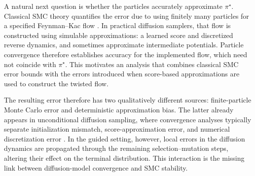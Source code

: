 \documentclass[11pt]{article}
\theoremstyle{plain}
\theoremstyle{definition}
\theoremstyle{remark}
\begin{document}
A natural next question is whether the particles accurately approximate \(\pi^\star\). Classical SMC theory quantifies the error due to using finitely many particles for a specified Feynman--Kac flow \citep{delmoral2004feynman,whiteley2012sequential,douc2014longterm}. In practical diffusion samplers, that flow is constructed using simulable approximations: a learned score and discretized reverse dynamics, and sometimes approximate intermediate potentials. Particle convergence therefore establishes accuracy for the implemented flow, which need not coincide with \(\pi^\star\). This motivates an analysis that combines classical SMC error bounds with the errors introduced when score-based approximations are used to construct the twisted flow.

The resulting error therefore has two qualitatively different sources: finite-particle Monte Carlo error and deterministic approximation bias. The latter already appears in unconditional diffusion sampling, where convergence analyses typically separate initialization mismatch, score-approximation error, and numerical discretization error \citep{chen2023sampling,benton2024nearly,conforti_kl,strasman2025an,strasman2025wasserstein,silveri205beyond}. In the guided setting, however, local errors in the diffusion dynamics are propagated through the remaining selection--mutation steps, altering their effect on the terminal distribution. This interaction is the missing link between diffusion-model convergence and SMC stability.

%
\end{document}
